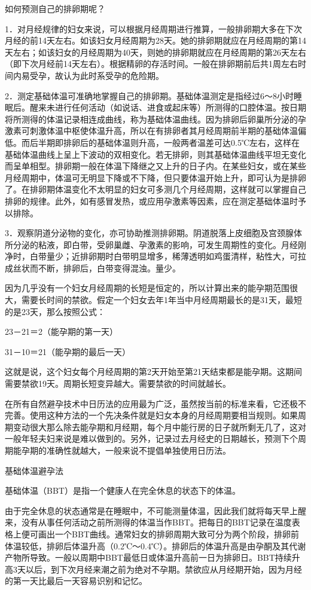 \documentclass[12pt,UTF8]{ctexbook}
\begin{document}
如何预测自己的排卵期呢？

1．对月经规律的妇女来说，可以根据月经周期进行推算，一般排卵期大多在下次月经的前14天左右。如该妇女月经周期为28天。她的排卵期就应在月经周期的第14天左右；如该妇女的月经周期为40天，则她的排卵期就应在月经周期的第26天左右（即下次月经前14天左右）。根据精卵的存活时间。一般在排卵期前后共1周左右时间内易受孕，故认为此时系受孕的危险期。

2．测定基础体温可准确地掌握自己的排卵期。基础体温测定是指经过6～8小时睡眠后。醒来未进行任何活动（如说话、进食或起床等）所测得的口腔体温。按日期将所测得的体温记录相连成曲线，称为基础体温曲线。因为排卵后卵巢所分泌的孕激素可刺激体温中枢使体温升高，所以在有排卵者其月经周期前半期的基础体温偏低。而后半期即排卵后的基础体温则升高，一般两者温差可达0.5℃左右，这样在基础体温曲线上呈上下波动的双相变化。若无排卵，则其基础体温曲线平坦无变化而呈单相型。排卵期一般在体温下降继之又上升的日子内。在某些妇女，或在某些月经周期中，体温可无明显下降或不下降，但只要体温开始上升，即可认为是排卵了。在排卵期体温变化不太明显的妇女可多测几个月经周期，这样就可以掌握自己排卵的规律。此外，如有感冒发热，或应用孕激素等因素，应在测定基础体温时予以排除。

3．观察阴道分泌物的变化，亦可协助推测排卵期。阴道脱落上皮细胞及宫颈腺体所分泌的粘液，即白带，受卵巢雌、孕激素的影响，可发生周期性的变化。月经刚净时，白带量少；近排卵期时白带明显增多，稀薄透明如鸡蛋清样，粘性大，可拉成丝状而不断，排卵后，白带变得混浊。量少。

因为几乎没有一个妇女月经周期的长短是恒定的，所以计算出来的能孕期范围很大，需要长时间的禁欲。假定一个妇女去年1年当中月经周期最长的是31天，最短的是23天，那么按照公式：

23－21＝2（能孕期的第一天）

31－10＝21（能孕期的最后一天）

这就是说，这个妇女每个月经周期的第2天开始至第21天结束都是能孕期。这期间需要禁欲19天。周期长短变异越大。需要禁欲的时间就越长。

在所有自然避孕技术中日历法的应用最为广泛，虽然按当前的标准来看，它还极不完善。使用这种方法的一个先决条件就是妇女本身的月经周期要相当规则。如果周期变动很大那么除去能孕期和月经期，每个月中能行房的日子就所剩无几了，这对一般年轻夫妇来说是难以做到的。另外，记录过去月经史的日期越长，预测下个周期能孕期的准确性就越大，一般来说不提倡单独使用日历法。

基础体温避孕法

基础体温（BBT）是指一个健康人在完全休息的状态下的体温。

由于完全休息的状态通常是在睡眠中，不可能测量体温，因此我们就将每天早上醒来，没有从事任何活动之前所测得的体温当作BBT。把每日的BBT记录在温度表格上便可画出一个BBT曲线。通常妇女的排卵周期大致可分为两个阶段，排卵前体温较低，排卵后体温升高（0.2℃～0.4℃）。排卵后的体温升高是由孕酮及其代谢产物所导致。一般以周期中BBT最低日或体温升高前一日为排卵日。BBT持续升高3天以后，到下次月经来潮之前为绝对不孕期。禁欲应从月经期开始，因为月经的第一天比最后一天容易识别和记忆。
\end{document}
